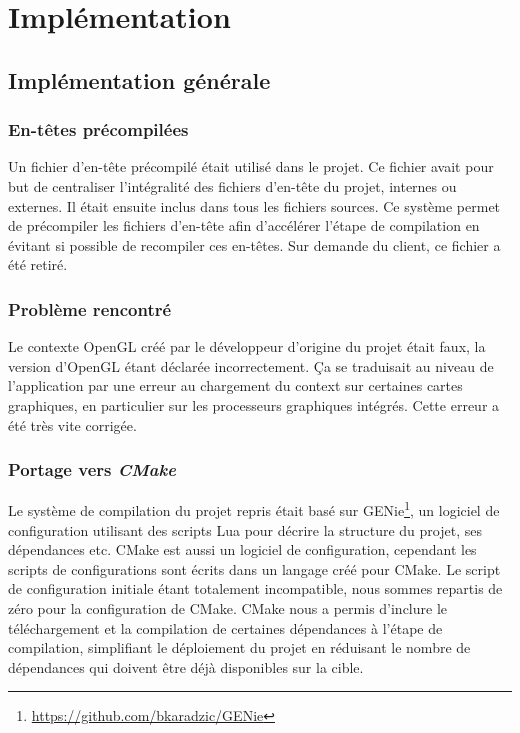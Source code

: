\chapter{Implémentation}

    \section{Implémentation générale}
    
    \subsection{En-têtes précompilées}
    Un fichier d'en-tête précompilé était utilisé dans le projet. Ce fichier
    avait pour but de centraliser l'intégralité des fichiers d'en-tête du
    projet, internes ou externes. Il était ensuite inclus dans tous les
    fichiers sources. Ce système permet de précompiler les fichiers
    d'en-tête afin d'accélérer l'étape de compilation en évitant si possible
    de recompiler ces en-têtes. Sur demande du client, ce fichier a été
    retiré. 
    
    \subsection{Problème rencontré}
    Le contexte OpenGL créé par le développeur d'origine du projet était faux, la version d'OpenGL étant déclarée incorrectement. Ça se traduisait au niveau
    de l'application par une erreur au chargement du context sur certaines cartes graphiques, en particulier sur les processeurs graphiques intégrés. Cette erreur a été très vite corrigée.
   
    \subsection{Portage vers \textit{CMake}}
    Le système de compilation du projet repris était basé sur GENie\footnote{\url{https://github.com/bkaradzic/GENie}}, un
    logiciel de configuration utilisant des scripts Lua pour décrire la
    structure du projet, ses dépendances etc. CMake est aussi un logiciel de
    configuration, cependant les scripts de configurations sont écrits dans
    un langage créé pour CMake. Le script de configuration initiale étant
    totalement incompatible, nous sommes repartis de zéro pour la
    configuration de CMake. CMake nous a permis d'inclure le téléchargement
    et la compilation de certaines dépendances à l'étape de compilation,
    simplifiant le déploiement du projet en réduisant le nombre de
    dépendances qui doivent être déjà disponibles sur la cible.
    
